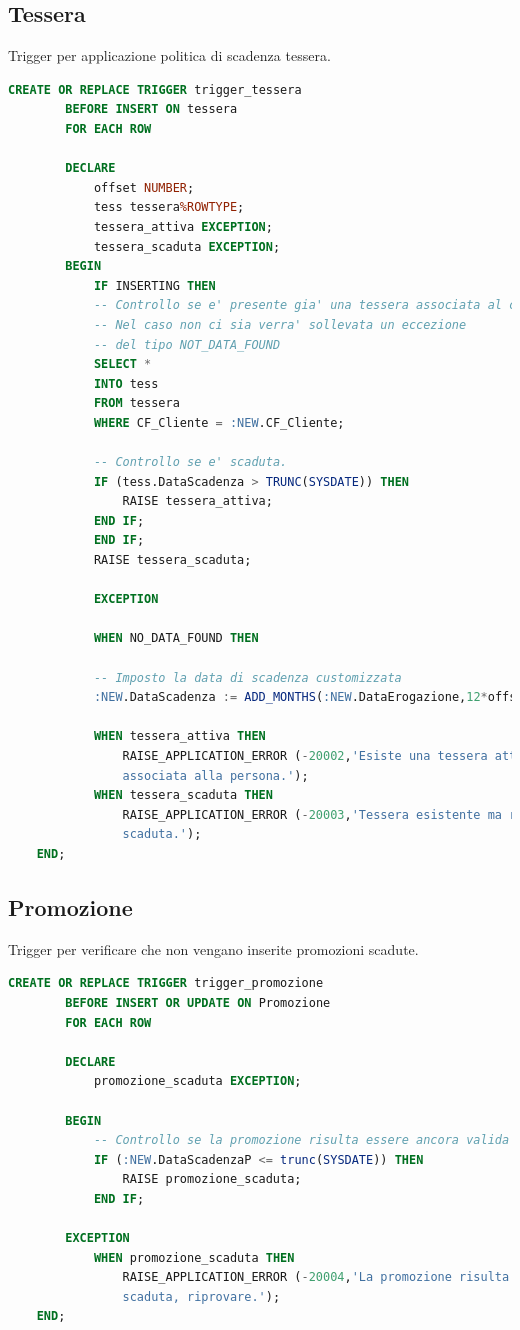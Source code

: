 \documentclass[12pt]{report}
\begin{document}
\subsection*{Tessera}

Trigger per applicazione politica di scadenza tessera.

\begin{lstlisting}[language=SQL,caption={TR\_TESSERA}]
    CREATE OR REPLACE TRIGGER trigger_tessera
		BEFORE INSERT ON tessera
		FOR EACH ROW

		DECLARE
			offset NUMBER;
			tess tessera%ROWTYPE;
			tessera_attiva EXCEPTION;
			tessera_scaduta EXCEPTION;
		BEGIN
			IF INSERTING THEN
			-- Controllo se e' presente gia' una tessera associata al cf. 
			-- Nel caso non ci sia verra' sollevata un eccezione
			-- del tipo NOT_DATA_FOUND
			SELECT * 
			INTO tess
			FROM tessera
			WHERE CF_Cliente = :NEW.CF_Cliente;

			-- Controllo se e' scaduta. 
			IF (tess.DataScadenza > TRUNC(SYSDATE)) THEN
				RAISE tessera_attiva;
			END IF;
			END IF;
			RAISE tessera_scaduta;
			
			EXCEPTION
		
			WHEN NO_DATA_FOUND THEN

			-- Imposto la data di scadenza customizzata
			:NEW.DataScadenza := ADD_MONTHS(:NEW.DataErogazione,12*offset);

			WHEN tessera_attiva THEN
				RAISE_APPLICATION_ERROR (-20002,'Esiste una tessera attiva
				associata alla persona.');
			WHEN tessera_scaduta THEN 
				RAISE_APPLICATION_ERROR (-20003,'Tessera esistente ma risulta 
				scaduta.');
	END;
\end{lstlisting}

\subsection*{Promozione}
Trigger per verificare che non vengano inserite promozioni scadute.
\begin{lstlisting}[language=SQL,caption={TR\_PROMOZIONE}]
	CREATE OR REPLACE TRIGGER trigger_promozione
	    BEFORE INSERT OR UPDATE ON Promozione 
	    FOR EACH ROW

		DECLARE
			promozione_scaduta EXCEPTION;

		BEGIN
		    -- Controllo se la promozione risulta essere ancora valida
			IF (:NEW.DataScadenzaP <= trunc(SYSDATE)) THEN
				RAISE promozione_scaduta;
			END IF;

		EXCEPTION
			WHEN promozione_scaduta THEN
				RAISE_APPLICATION_ERROR (-20004,'La promozione risulta 
				scaduta, riprovare.');
	END;
\end{lstlisting}
\end{document}
